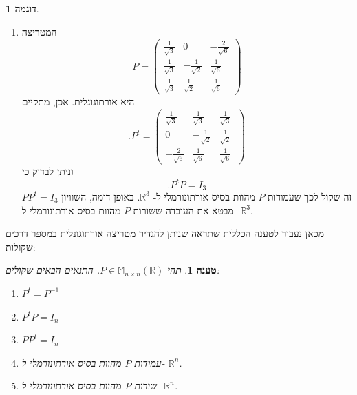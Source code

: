 \documentclass[12pt]{report}
\theoremstyle{plain}
\newtheorem{proposition}[theorem]{טענה}
\theoremstyle{definition}
\newtheorem{example}{דוגמה}[chapter]
\newcommand{\R}{\mathbb{R}}
\newcommand{\M}{\mathbb{M}}
\newcommand{\0}{\mathbf{0}}
\begin{document}
\begin{example}
\begin{enumerate}[label=\alph*.]
באופן דומה, החישוב
$$
PP^t=\begin{pmatrix}
\cos\theta & -\sin\theta \\
\sin\theta & \cos\theta
\end{pmatrix}\begin{pmatrix}
\cos\theta & \sin\theta \\
-\sin\theta & \cos\theta
\end{pmatrix}=\begin{pmatrix}
1 & 0 \\
0 & 1
\end{pmatrix}=I_2
$$
מראה כי וקטורי השורות של
$P$
מהווים בסיס אורתונורמלי ל-
$\R^2$.


\item 
המטריצה
$$
P=\begin{pmatrix}
\frac{1}{\sqrt{3}} & 0 & -\frac{2}{\sqrt{6}} \\
\frac{1}{\sqrt{3}} & -\frac{1}{\sqrt{2}} & \frac{1}{\sqrt{6}} \\
\frac{1}{\sqrt{3}} & \frac{1}{\sqrt{2}} & \frac{1}{\sqrt{6}}\
\end{pmatrix}
$$
היא אורתוגונלית. אכן, מתקיים
$$
.P^t=\begin{pmatrix}
\frac{1}{\sqrt{3}} & \frac{1}{\sqrt{3}} & \frac{1}{\sqrt{3}} \\
0 & -\frac{1}{\sqrt{2}} & \frac{1}{\sqrt{2}} \\
-\frac{2}{\sqrt{6}} & \frac{1}{\sqrt{6}} & \frac{1}{\sqrt{6}}\
\end{pmatrix}
$$
וניתן לבדוק כי
$$
.P^tP=I_3
$$
זה שקול לכך שעמודות 
$P$
מהוות בסיס אורתונורמלי ל-
$\R^3$.
באופן דומה, השוויון
$PP^t=I_3$
מבטא את העובדה ששורות
$P$
מהוות בסיס אורתונורמלי ל-
$\R^3$.


\end{enumerate}
\end{example}

מכאן נעבור לטענה הכללית שתראה שניתן להגדיר מטריצה אורתוגונלית במספר דרכים שקולות:

\begin{proposition}\label{prop:ortho-matrix}
תהי 
$P\in\M_{n\times n}(\R)$.
התנאים הבאים שקולים:

\begin{enumerate}[label=\alph*.]
\item 
$P^t=P^{-1}$


\item 
$P^tP=I_n$


\item 
$PP^t=I_n$


\item 
עמודות
$P$
מהוות בסיס אורתונורמלי ל-
$\R^n$.


\item 
שורות
$P$
מהוות בסיס אורתונורמלי ל-
$\R^n$.


\end{enumerate}
\end{proposition}
\end{document}
